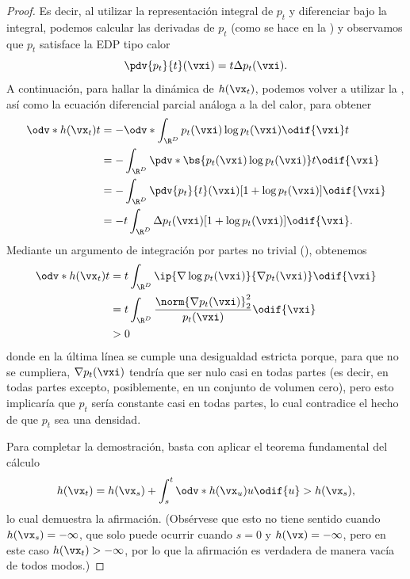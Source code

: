\documentclass[../../book-main_es.tex]{subfiles}
\begin{document}
\begin{proof}
    Es decir, al utilizar la representación integral de \(p_{t}\) y
    diferenciar bajo la integral, podemos calcular las
    derivadas de \(p_{t}\) (como se hace en la
    ) y observamos que \(p_{t}\) satisface
    la EDP tipo calor
    \begin{equation}
        \pdv{p_{t}}{t}(\vxi) = t\Delta p_{t}(\vxi).
    \end{equation}
    A continuación, para hallar la dinámica de \(h(\vx_{t})\), podemos volver a utilizar la
    , así como la ecuación diferencial parcial análoga a la del calor, para obtener
    \begin{align}
        \odv*{h(\vx_{t})}{t}
        &= -\odv*{\int_{\R^{D}}p_{t}(\vxi)\log p_{t}(\vxi)\odif{\vxi}}{t} \\
        &= -\int_{\R^{D}}\pdv*{\bs{p_{t}(\vxi)\log
        p_{t}(\vxi)}}{t}\odif{\vxi} \\
        &= -\int_{\R^{D}}\pdv{p_{t}}{t}(\vxi)[1 + \log
        p_{t}(\vxi)]\odif{\vxi} \\
        &= -t\int_{\R^{D}}\Delta p_{t}(\vxi)[1 + \log p_{t}(\vxi)]\odif{\vxi}.
    \end{align}
    Mediante un argumento de integración por partes no trivial
    (), obtenemos
    \begin{align}
        \odv*{h(\vx_{t})}{t}
        &= t\int_{\R^{D}}\ip{\nabla \log p_{t}(\vxi)}{\nabla
        p_{t}(\vxi)}\odif{\vxi} \\
        &= t\int_{\R^{D}}\frac{\norm{\nabla
        p_{t}(\vxi)}_{2}^{2}}{p_{t}(\vxi)}\odif{\vxi} \\
        &> 0
    \end{align}
    donde en la última línea se cumple una desigualdad estricta porque, para que
    no se cumpliera, \(\nabla p_{t}(\vxi)\) tendría que ser nulo casi
    en todas partes (es decir, en todas partes excepto, posiblemente, en un conjunto de volumen cero), 
    pero esto implicaría que \(p_{t}\) sería constante
    casi en todas partes, lo cual contradice el hecho de que \(p_{t}\) sea una densidad.

    Para completar la demostración, basta con aplicar el teorema fundamental del cálculo
    \begin{equation}
        h(\vx_{t}) = h(\vx_{s}) +
        \int_{s}^{t}\odv*{h(\vx_{u})}{u}\odif{u} > h(\vx_{s}),
    \end{equation}
    lo cual demuestra la afirmación. (Obsérvese que esto no tiene sentido cuando
        \(h(\vx_{s}) = -\infty\), que solo puede ocurrir cuando \(s = 0\)
        y \(h(\vx) = -\infty\), pero en este caso \(h(\vx_{t}) >
    -\infty\), por lo que la afirmación es verdadera de manera vacía de todos modos.)
\end{proof}
\end{document}
